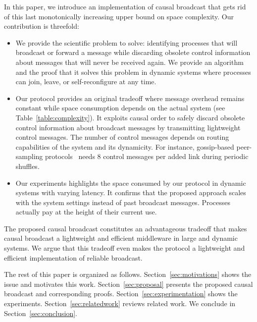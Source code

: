 In this paper, we introduce an implementation of causal broadcast that gets rid
of this last monotonically increasing upper bound on space complexity.  Our
contribution is threefold:
\begin{itemize}[leftmargin=*]
\item We provide the scientific problem to solve: identifying processes that
  will broadcast or forward a message while discarding obsolete control
  information about messages that will never be received again. We provide an
  algorithm and the proof that it solves this problem in dynamic systems where
  processes can join, leave, or self-reconfigure at any time.
\item Our protocol provides an original tradeoff where message overhead remains
  constant while space consumption depends on the actual system (see
  Table~\ref{table:complexity}). It exploits causal order to safely discard
  obsolete control information about broadcast messages by transmitting
  lightweight control messages. The number of control messages depends on
  routing capabilities of the system and its dynamicity. For instance,
  gossip-based peer-sampling
  protocols~\cite{jelasity2007gossip,jelasity2009tman,nedelec2017adaptive} needs
  8 control messages per added link during periodic shuffles.
\item Our experiments highlights the space consumed by our protocol in dynamic
  systems with varying latency. It confirms that the proposed approach scales
  with the system settings instead of past broadcast messages. Processes
  actually pay at the height of their current use.
\end{itemize}
The proposed causal broadcast constitutes an advantageous tradeoff that makes
causal broadcast a lightweight and efficient middleware in large and dynamic
systems. We argue that this tradeoff even makes the protocol a lightweight and
efficient implementation of reliable broadcast.

The rest of this paper is organized as follows. Section~\ref{sec:motivations}
shows the issue and motivates this work. Section~\ref{sec:proposal} presents the
proposed causal broadcast and corresponding
proofs. Section~\ref{sec:experimentation} shows the
experiments. Section~\ref{sec:relatedwork} reviews related work. We conclude in
Section~\ref{sec:conclusion}.


